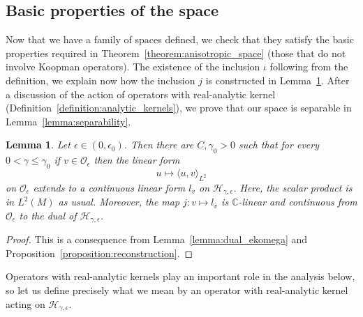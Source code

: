 \documentclass[10pt]{amsart}
\newtheorem{lemm}[theo]{Lemma}\newtheorem{prop}[theo]{Proposition}\newtheorem{coro}[theo]{Corollary}\newtheorem{conj}[theo]{Conjecture}
\theoremstyle{definition}\newtheorem{defi}[theo]{Definition}\newtheorem{rema}[theo]{Remark}\newtheorem{exam}[theo]{Example}\newtheorem{exem}[theo]{Example}\newtheorem{nota}[theo]{Notation}
\newcommand{\clO}{\mathcal{O}}
\newcommand{\clH}{\mathcal{H}}
\newcommand{\bbC}{\mathbb{C}}
\begin{document}
\subsection{Basic properties of the space}

Now that we have a family of spaces defined, we check that they satisfy the basic properties required in Theorem~\ref{theorem:anisotropic_space} (those that do not involve Koopman operators). The existence of the inclusion $\iota$ following from the definition, we explain now how the inclusion $j$ is constructed in Lemma~\ref{lemma:injection_dual}. After a discussion of the action of operators with real-analytic kernel (Definition~\ref{definition:analytic_kernels}), we prove that our space is separable in Lemma~\ref{lemma:separability}.

\begin{lemm}\label{lemma:injection_dual}
Let $\epsilon \in(0,\epsilon_0)$. Then there are $C,\gamma_0 >0$ such that for every $0 < \gamma \leq \gamma_0$ if $v \in \clO_\epsilon$ then the linear form
\begin{equation*}
u \mapsto \langle u, v \rangle_{L^2}
\end{equation*}
on $\clO_\epsilon$ extends to a continuous linear form $l_v$ on $\clH_{\gamma,\epsilon}$. Here, the scalar product is in $L^2(M)$ as usual. Moreover, the map $j : v \mapsto l_{\bar{v}}$ is $\bbC$-linear and continuous from $\clO_\epsilon$ to the dual of $\clH_{\gamma,\epsilon}$.
\end{lemm}

\begin{proof}
This is a consequence from Lemma~\ref{lemma:dual_ekomega} and Proposition~\ref{proposition:reconstruction}.
\end{proof}

Operators with real-analytic kernels play an important role in the analysis below, so let us define precisely what we mean by an operator with real-analytic kernel acting on $\clH_{\gamma,\epsilon}$.
\end{document}
